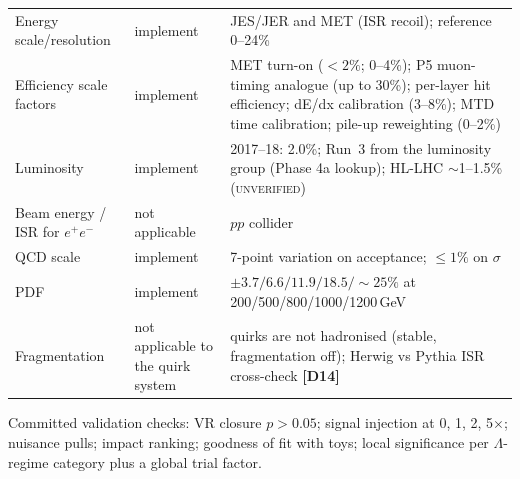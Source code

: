 \documentclass[11pt,a4paper]{article}
\newcommand{\UNV}{\textsc{unverified}}
\newcommand{\lab}[1]{\textbf{[#1]}}
\begin{document}
{\begin{longtable}{@{}L{3.53cm}L{2.07cm}L{10.79cm}@{}}
Energy scale/resolution & implement & JES/JER and MET (ISR recoil); reference 0--24\%\\
Efficiency scale factors & implement & MET turn-on ($<2\%$; 0--4\%); P5 muon-timing analogue (up to 30\%); per-layer hit efficiency; dE/dx calibration (3--8\%); MTD time calibration; pile-up reweighting (0--2\%)\\
Luminosity & implement & 2017--18: 2.0\%; Run~3 from the luminosity group (Phase 4a lookup); HL-LHC $\sim$1--1.5\% (\UNV)\\
Beam energy / ISR for $e^+e^-$ & not applicable & $pp$ collider\\
QCD scale & implement & 7-point variation on acceptance; $\leq1\%$ on $\sigma$\\
PDF & implement & $\pm3.7/6.6/11.9/18.5/\sim25\%$ at 200/500/800/1000/1200\,GeV\\
Fragmentation & not applicable to the quirk system & quirks are not hadronised (stable, fragmentation off); Herwig vs Pythia ISR cross-check \lab{D14}\\
\end{longtable}
}
Committed validation checks: VR closure $p>0.05$; signal injection at 0, 1, 2, 5$\times$; nuisance pulls; impact ranking; goodness of fit with toys; local significance per $\Lambda$-regime category plus a global trial factor.
\end{document}
